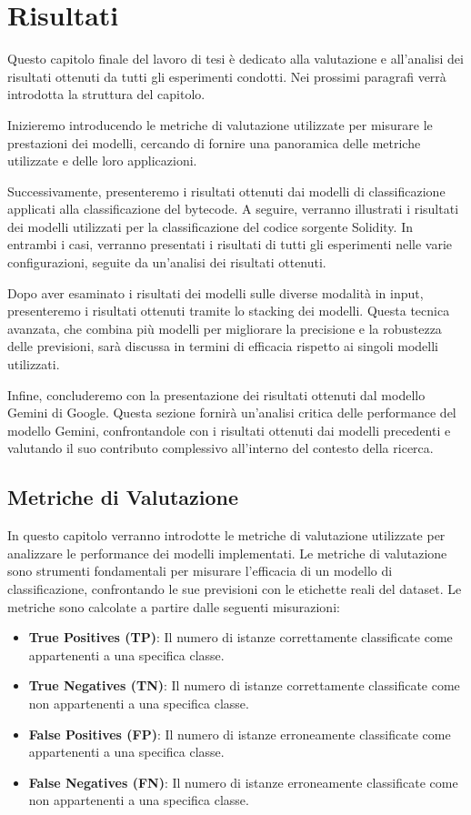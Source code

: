 \documentclass[../../Thesis.tex]{subfiles}
\begin{document}
\chapter{Risultati}
\label{chap:results}
Questo capitolo finale del lavoro di tesi \`e dedicato alla valutazione e all'analisi dei risultati ottenuti da tutti gli esperimenti condotti. Nei prossimi paragrafi verr\`a introdotta la struttura del capitolo. 

Inizieremo introducendo le metriche di valutazione utilizzate per misurare le prestazioni dei modelli, cercando di fornire una panoramica delle metriche utilizzate e delle loro applicazioni. 

Successivamente, presenteremo i risultati ottenuti dai modelli di classificazione applicati alla classificazione del bytecode. 
A seguire, verranno illustrati i risultati dei modelli utilizzati per la classificazione del codice sorgente Solidity. In entrambi i casi, verranno presentati i risultati di tutti gli esperimenti nelle varie configurazioni, seguite da un'analisi dei risultati ottenuti.

Dopo aver esaminato i risultati dei modelli sulle diverse modalit\`a in input, presenteremo i risultati ottenuti tramite lo stacking dei modelli. Questa tecnica avanzata, che combina pi\`u modelli per migliorare la precisione e la robustezza delle previsioni, sar\`a discussa in termini di efficacia rispetto ai singoli modelli utilizzati.

Infine, concluderemo con la presentazione dei risultati ottenuti dal modello Gemini di Google. Questa sezione fornir\`a un'analisi critica delle performance del modello Gemini, confrontandole con i risultati ottenuti dai modelli precedenti e valutando il suo contributo complessivo all'interno del contesto della ricerca.

\section{Metriche di Valutazione}

In questo capitolo verranno introdotte le metriche di valutazione utilizzate per analizzare le performance dei modelli implementati. Le metriche di valutazione sono strumenti fondamentali per misurare l'efficacia di un modello di classificazione, confrontando le sue previsioni con le etichette reali del dataset. Le metriche sono calcolate a partire dalle seguenti misurazioni:

\begin{itemize}
\item \textbf{True Positives (TP)}: Il numero di istanze correttamente classificate come appartenenti a una specifica classe.
\item \textbf{True Negatives (TN)}: Il numero di istanze correttamente classificate come non appartenenti a una specifica classe.
\item \textbf{False Positives (FP)}: Il numero di istanze erroneamente classificate come appartenenti a una specifica classe.
\item \textbf{False Negatives (FN)}: Il numero di istanze erroneamente classificate come non appartenenti a una specifica classe.
\end{itemize}
\end{document}

